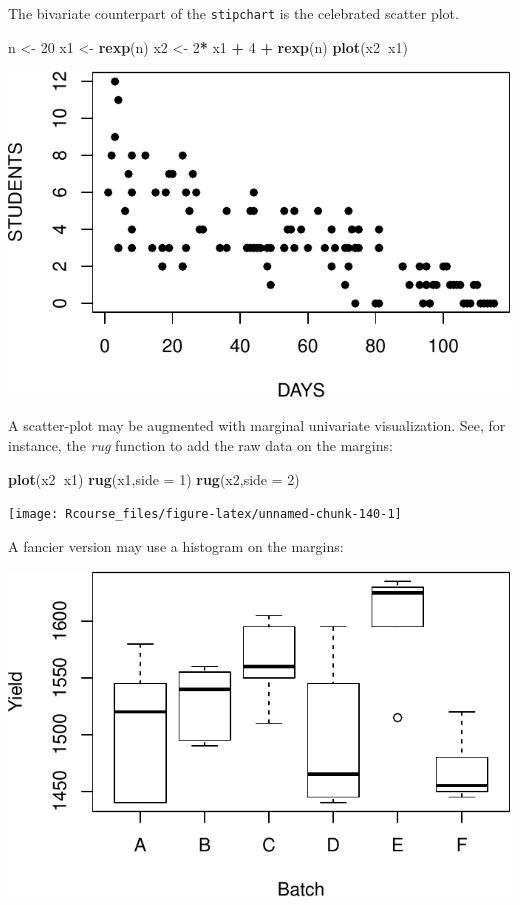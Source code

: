 \documentclass[]{book}
\newenvironment{Shaded}{\begin{snugshade}}{\end{snugshade}}
\newcommand{\KeywordTok}[1]{\textcolor[rgb]{0.13,0.29,0.53}{\textbf{#1}}}
\newcommand{\DataTypeTok}[1]{\textcolor[rgb]{0.13,0.29,0.53}{#1}}
\newcommand{\DecValTok}[1]{\textcolor[rgb]{0.00,0.00,0.81}{#1}}
\newcommand{\StringTok}[1]{\textcolor[rgb]{0.31,0.60,0.02}{#1}}
\newcommand{\OperatorTok}[1]{\textcolor[rgb]{0.81,0.36,0.00}{\textbf{#1}}}
\newcommand{\NormalTok}[1]{#1}
\theoremstyle{definition}
\theoremstyle{definition}
\theoremstyle{definition}
\theoremstyle{remark}
\begin{document}
The bivariate counterpart of the \texttt{stipchart} is the celebrated
scatter plot.

\begin{Shaded}
\begin{Highlighting}[]
\NormalTok{n <-}\StringTok{ }\DecValTok{20}
\NormalTok{x1 <-}\StringTok{ }\KeywordTok{rexp}\NormalTok{(n)}
\NormalTok{x2 <-}\StringTok{ }\DecValTok{2}\OperatorTok{*}\StringTok{ }\NormalTok{x1 }\OperatorTok{+}\StringTok{ }\DecValTok{4} \OperatorTok{+}\StringTok{ }\KeywordTok{rexp}\NormalTok{(n)}
\KeywordTok{plot}\NormalTok{(x2}\OperatorTok{~}\NormalTok{x1)}
\end{Highlighting}
\end{Shaded}

\includegraphics[width=0.5\linewidth]{Rcourse_files/figure-latex/unnamed-chunk-139-1}

A scatter-plot may be augmented with marginal univariate visualization.
See, for instance, the \emph{rug} function to add the raw data on the
margins:

\begin{Shaded}
\begin{Highlighting}[]
\KeywordTok{plot}\NormalTok{(x2}\OperatorTok{~}\NormalTok{x1)}
\KeywordTok{rug}\NormalTok{(x1,}\DataTypeTok{side =} \DecValTok{1}\NormalTok{)}
\KeywordTok{rug}\NormalTok{(x2,}\DataTypeTok{side =} \DecValTok{2}\NormalTok{)}
\end{Highlighting}
\end{Shaded}

\texttt{[image: Rcourse\_files/figure-latex/unnamed-chunk-140-1]}

A fancier version may use a histogram on the margins:

\includegraphics[width=0.5\linewidth]{Rcourse_files/figure-latex/unnamed-chunk-141-1}
\end{document}
